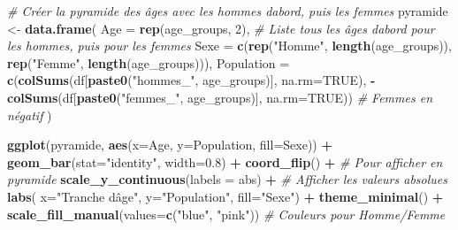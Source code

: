 \documentclass[
]{article}
\newenvironment{Shaded}{\begin{snugshade}}{\end{snugshade}}
\newcommand{\AttributeTok}[1]{\textcolor[rgb]{0.13,0.29,0.53}{#1}}
\newcommand{\CommentTok}[1]{\textcolor[rgb]{0.56,0.35,0.01}{\textit{#1}}}
\newcommand{\ConstantTok}[1]{\textcolor[rgb]{0.56,0.35,0.01}{#1}}
\newcommand{\DecValTok}[1]{\textcolor[rgb]{0.00,0.00,0.81}{#1}}
\newcommand{\FloatTok}[1]{\textcolor[rgb]{0.00,0.00,0.81}{#1}}
\newcommand{\FunctionTok}[1]{\textcolor[rgb]{0.13,0.29,0.53}{\textbf{#1}}}
\newcommand{\NormalTok}[1]{#1}
\newcommand{\OtherTok}[1]{\textcolor[rgb]{0.56,0.35,0.01}{#1}}
\newcommand{\SpecialCharTok}[1]{\textcolor[rgb]{0.81,0.36,0.00}{\textbf{#1}}}
\newcommand{\StringTok}[1]{\textcolor[rgb]{0.31,0.60,0.02}{#1}}
\begin{document}
\begin{Shaded}
\begin{Highlighting}[]
\CommentTok{\# Créer la pyramide des âges avec les hommes d\textquotesingle{}abord, puis les femmes}
\NormalTok{pyramide }\OtherTok{\textless{}{-}} \FunctionTok{data.frame}\NormalTok{(}
  \AttributeTok{Age =} \FunctionTok{rep}\NormalTok{(age\_groups, }\DecValTok{2}\NormalTok{),  }\CommentTok{\# Liste tous les âges d\textquotesingle{}abord pour les hommes, puis pour les femmes}
  \AttributeTok{Sexe =} \FunctionTok{c}\NormalTok{(}\FunctionTok{rep}\NormalTok{(}\StringTok{"Homme"}\NormalTok{, }\FunctionTok{length}\NormalTok{(age\_groups)), }\FunctionTok{rep}\NormalTok{(}\StringTok{"Femme"}\NormalTok{, }\FunctionTok{length}\NormalTok{(age\_groups))),}
  \AttributeTok{Population =} \FunctionTok{c}\NormalTok{(}\FunctionTok{colSums}\NormalTok{(df[}\FunctionTok{paste0}\NormalTok{(}\StringTok{"hommes\_"}\NormalTok{, age\_groups)], }\AttributeTok{na.rm=}\ConstantTok{TRUE}\NormalTok{),}
                 \SpecialCharTok{{-}}\FunctionTok{colSums}\NormalTok{(df[}\FunctionTok{paste0}\NormalTok{(}\StringTok{"femmes\_"}\NormalTok{, age\_groups)], }\AttributeTok{na.rm=}\ConstantTok{TRUE}\NormalTok{))  }\CommentTok{\# Femmes en négatif}
\NormalTok{)}



\FunctionTok{ggplot}\NormalTok{(pyramide, }\FunctionTok{aes}\NormalTok{(}\AttributeTok{x=}\NormalTok{Age, }\AttributeTok{y=}\NormalTok{Population, }\AttributeTok{fill=}\NormalTok{Sexe)) }\SpecialCharTok{+}
  \FunctionTok{geom\_bar}\NormalTok{(}\AttributeTok{stat=}\StringTok{"identity"}\NormalTok{, }\AttributeTok{width=}\FloatTok{0.8}\NormalTok{) }\SpecialCharTok{+}
  \FunctionTok{coord\_flip}\NormalTok{() }\SpecialCharTok{+}  \CommentTok{\# Pour afficher en pyramide}
  \FunctionTok{scale\_y\_continuous}\NormalTok{(}\AttributeTok{labels =}\NormalTok{ abs) }\SpecialCharTok{+}  \CommentTok{\# Afficher les valeurs absolues}
  \FunctionTok{labs}\NormalTok{(}
       \AttributeTok{x=}\StringTok{"Tranche d\textquotesingle{}âge"}\NormalTok{,}
       \AttributeTok{y=}\StringTok{"Population"}\NormalTok{,}
       \AttributeTok{fill=}\StringTok{"Sexe"}\NormalTok{) }\SpecialCharTok{+}
  \FunctionTok{theme\_minimal}\NormalTok{() }\SpecialCharTok{+}
  \FunctionTok{scale\_fill\_manual}\NormalTok{(}\AttributeTok{values=}\FunctionTok{c}\NormalTok{(}\StringTok{"blue"}\NormalTok{, }\StringTok{"pink"}\NormalTok{))  }\CommentTok{\# Couleurs pour Homme/Femme}
\end{Highlighting}
\end{Shaded}
\end{document}
